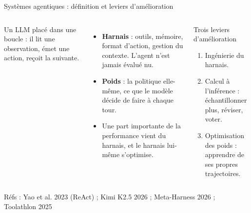 \documentclass[aspectratio=169,10pt]{beamer}
\newcommand{\refs}[1]{\vfill{\tiny\textcolor{crMid}{Réfs : #1}}}
\begin{document}
\begin{frame}{Systèmes agentiques : définition et leviers d'amélioration}
\begin{columns}[T]
Un LLM placé dans une boucle : il lit une observation, émet une action, reçoit la suivante.
\vspace{0.2cm}
\begin{itemize}
  \item \textbf{Harnais} : outils, mémoire, format d'action, gestion du contexte. L'agent n'est jamais évalué nu.
  \item \textbf{Poids} : la politique elle-même, ce que le modèle décide de faire à chaque tour.
  \item Une part importante de la performance vient du harnais, et le harnais lui-même s'optimise.
\end{itemize}
\begin{block}{Trois leviers d'amélioration}
\begin{enumerate}
  \item Ingénierie du harnais.
  \item Calcul à l'inférence : échantillonner plus, réviser, voter.
  \item Optimisation des poids : apprendre de ses propres trajectoires.
\end{enumerate}
\end{block}
\end{columns}
\refs{Yao et al. 2023 (ReAct) ; Kimi K2.5 2026 ; Meta-Harness 2026 ; Toolathlon 2025}
\end{frame}
\end{document}
